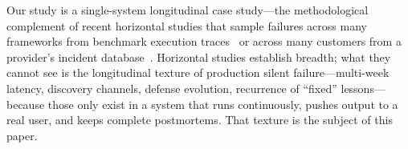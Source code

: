 Our study is a single-system longitudinal case study---the methodological
complement of recent horizontal studies that sample failures across many
frameworks from benchmark execution traces~\cite{cemri2025mast} or across
many customers from a provider's incident
database~\cite{ranganathan2025inference}. Horizontal studies establish
breadth; what they cannot see is the longitudinal texture of production
silent failure---multi-week latency, discovery channels, defense
evolution, recurrence of ``fixed'' lessons---because those only exist in
a system that runs continuously, pushes output to a real user, and keeps
complete postmortems. That texture is the subject of this paper.
